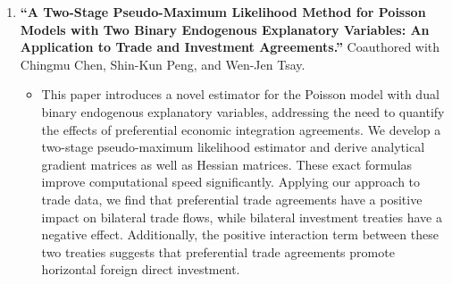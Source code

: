 \documentclass{article}
\begin{document}
\begin{enumerate}[resume]
\begin{itemize}
    \end{itemize}
    \item \textbf{“A Two-Stage Pseudo-Maximum Likelihood Method for Poisson Models with Two Binary Endogenous Explanatory Variables: An Application to Trade and Investment Agreements.”} Coauthored with Chingmu Chen, Shin-Kun Peng, and Wen-Jen Tsay. 
    \begin{itemize}
        \item[] This paper introduces a novel estimator for the Poisson model with dual binary endogenous explanatory variables, addressing the need to quantify the effects of preferential economic integration agreements. We develop a two-stage pseudo-maximum likelihood estimator and derive analytical gradient matrices as well as Hessian matrices. These exact formulas improve computational speed significantly. Applying our approach to trade data, we find that preferential trade agreements have a positive impact on bilateral trade flows, while bilateral investment treaties have a negative effect. Additionally, the positive interaction term between these two treaties suggests that preferential trade agreements promote horizontal foreign direct investment.
    \end{itemize}


\end{enumerate}
\end{document}
